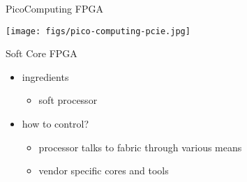 \begin{frame}[fragile]{PicoComputing FPGA}
\begin{center}
\texttt{[image: figs/pico-computing-pcie.jpg]} \\
\end{center}
\end{frame}

\begin{frame}[fragile]{Soft Core FPGA}

\begin{itemize}
\item ingredients
\begin{itemize}
\item soft processor 
\end{itemize}
\item how to control?
\begin{itemize}
\item processor talks to fabric through various means
\item vendor specific cores and tools
\end{itemize}
\end{itemize}

\end{frame}

